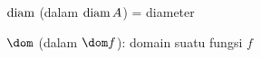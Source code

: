 \indexmedskip
{}

























$\mathop{\text{diam}}$ (dalam $\mathop{\text{diam}} A$) = diameter



$\dom$ (dalam $\dom f$):  domain suatu fungsi $f$
























































































